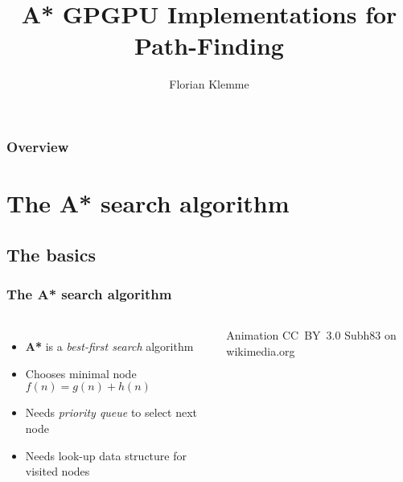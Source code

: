 \documentclass{beamer}
\begin{document}
\title{A* GPGPU Implementations for Path-Finding}
\author{Florian Klemme}
\frame{\titlepage}

\begin{frame}
    \frametitle{Overview}
    \tableofcontents
\end{frame}

\section{The A* search algorithm}
\subsection{The basics}
\begin{frame}
    \frametitle{The A* search algorithm}
    \begin{columns}
        
        \begin{itemize}
            \item \textbf{A*} is a \emph{best-first search} algorithm
            \item Chooses minimal node \(f(n) = g(n) + h(n)\)
            \item Needs \emph{priority queue} to select next node
            \item Needs look-up data structure for visited nodes
        \end{itemize}
        
        \vspace{1em}
        Animation CC~BY~3.0 Subh83 on wikimedia.org
    \end{columns}
\end{frame}
\end{document}
